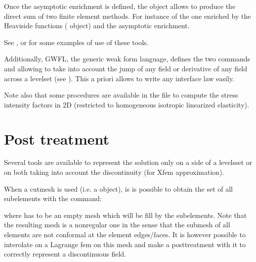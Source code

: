\documentclass[a4paper,11pt,english]{sphinxmanual}
\begin{document}
Once the asymptotic enrichment is defined, the object  allows to produce the direct sum of two finite element methods. For instance of the one enriched by the Heaviside functions ( object) and the asymptotic enrichment.

See ,  or  for some examples of use of these tools.

Additionally, GWFL, the generic weak form language, defines the two commands  and  allowing to take into account the jump of any field or derivative of any field across a level\sphinxhyphen{}set (see {\hyperref[\detokenize{userdoc/gasm_high:ud-gasm-high-xfem}]{}}). This a priori allows to write any interface law easily.

Note also that some procedures are available in the file  to compute the stress intensity factors in 2D (restricted to homogeneous isotropic linearized elasticity).


\section{Post treatment}
\label{\detokenize{userdoc/xfem:post-treatment}}
Several tools are available to represent the solution only on a side of a levels\sphinxhyphen{}set or on both taking into account the discontinuity (for Xfem approximation).

When a cut\sphinxhyphen{}mesh  is used (i.e. a  object), is is possible to obtain the set of all sub\sphinxhyphen{}elements with the command:

\begin{sphinxVerbatim}[commandchars=\\\{\}]
\end{sphinxVerbatim}

where  has to be an empty mesh which will be fill by the sub\sphinxhyphen{}elements. Note that the resulting mesh is a non\sphinxhyphen{}regular one in the sense that the sub\sphinxhyphen{}mesh of all elements are not conformal at the element edges/faces. It is however possible to interolate on a Lagrange fem on this mesh and make a post\sphinxhyphen{}treatment with it to correctly represent a discontinuous field.
\end{document}
